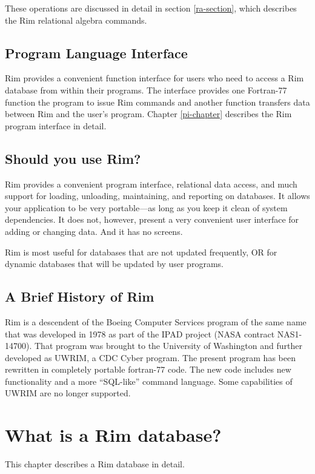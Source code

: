 \documentclass[11pt,a4paper]{report}
\def\I{\index}
\begin{document}
These operations are discussed in detail in section
\ref{ra-section}, which describes the Rim relational
algebra commands.
 
 
\section{Program Language Interface}
\I{fortran}
Rim provides a convenient function interface
for users who need to access a Rim database from
within their programs.  The interface provides one Fortran-77 function
the program to issue Rim commands and another
function transfers data between Rim and the user's program.
Chapter \ref{pi-chapter} describes the Rim program interface
in detail.
 
\section{Should you use Rim?}
Rim provides a convenient program interface,
relational data access,
and much support for loading, unloading,
maintaining, and reporting on databases.  
It allows your application to be very
portable---as long as you keep it clean of system dependencies.
It does not, however, present
a very convenient user interface for adding or changing data.
And it has no screens.  

Rim is most useful for databases that are not updated frequently,
OR for dynamic databases that will be updated by user programs.

\section{A Brief History of Rim}
Rim is a descendent of the Boeing Computer Services\I{Boeing} program
of the same name that was developed in 1978 as part of the IPAD project
(NASA contract NAS1-14700)\I{NASA}.
That program was brought
to the University of Washington and further developed
as UWRIM\I{UWRIM}, a CDC Cyber program.
The present program has been rewritten in completely portable
fortran-77 code.  The new code includes new functionality
and a more ``SQL-like'' command language.
Some capabilities of UWRIM are no longer supported.
 
%
%
\chapter{What is a Rim database?}
 
 
This chapter describes a Rim database in detail.
 
\end{document}
